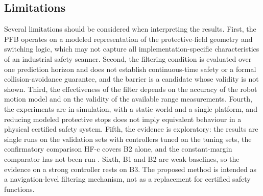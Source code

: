\subsection{Limitations}
Several limitations should be considered when interpreting the results. First, the PFB operates on a modeled representation of the protective-field geometry and switching logic, which may not capture all implementation-specific characteristics of an industrial safety scanner. Second, the filtering condition is evaluated over one prediction horizon and does not establish continuous-time safety or a formal collision-avoidance guarantee, and the barrier is a candidate whose validity is not shown. Third, the effectiveness of the filter depends on the accuracy of the robot motion model and on the validity of the available range measurements. Fourth, the experiments are in simulation, with a static world and a single platform, and reducing modeled protective stops does not imply equivalent behaviour in a physical certified safety system. Fifth, the evidence is exploratory: the results are single runs on the validation sets with controllers tuned on the tuning sets, the confirmatory comparison HF-c covers B2 alone, and the constant-margin comparator has not been run . Sixth, B1 and B2 are weak baselines, so the evidence on a strong controller rests on B3. The proposed method is intended as a navigation-level filtering mechanism, not as a replacement for certified safety functions. 

